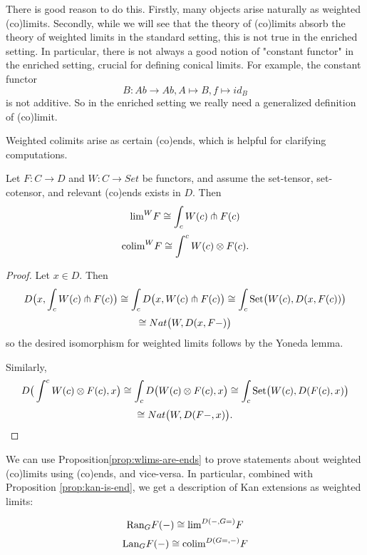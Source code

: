 There is good reason to do this. Firstly, many objects arise naturally as weighted (co)limits. Secondly, while we will see that the theory of (co)limits absorb the theory of weighted limits in the standard setting, this is not true in the enriched setting. In particular, there is not always a good notion of "constant functor" in the enriched setting, crucial for defining conical limits. For example, the constant functor $$B:Ab\rightarrow Ab, A\mapsto B, f\mapsto id_B$$ is not additive. So in the enriched setting we really need a generalized definition of (co)limit.

Weighted colimits arise as certain (co)ends, which is helpful for clarifying computations.
\begin{proposition}\label{prop:wlims-are-ends}
Let $F:C\rightarrow D$ and $W:C\rightarrow Set$ be functors, and assume the set-tensor, set-cotensor, and relevant (co)ends exists in $D$. Then
$$\text{lim}^{W}F\cong \int_c W(c)\pitchfork F(c)$$
$$\text{colim}^{W}F\cong \int^c W(c)\otimes F(c).$$
\end{proposition}
\begin{proof}
    Let $x\in D$. Then $$D\big(x,\int_c W(c)\pitchfork F(c)\big)\cong \int_cD\big(x,W(c)\pitchfork F(c)\big)\cong \int_c {\text{Set}}\big(W(c),D(x,F(c))\big)$$
    $$\cong Nat\big(W,D(x,F-)\big)$$
    so the desired isomorphism for weighted limits follows by the Yoneda lemma. 
    
    Similarly, $$D\big(\int^c W(c)\otimes F(c),x\big)\cong \int_cD\big(W(c)\otimes F(c),x\big)\cong \int_c {\text{Set}}\big(W(c),D(F(c),x)\big)$$
    $$\cong Nat\big(W,D(F-,x)\big).$$
\end{proof}

We can use Proposition\autoref{prop:wlims-are-ends} to prove statements about weighted (co)limits using (co)ends, and vice-versa. In particular, combined with Proposition \ref{prop:kan-is-end}, we get a description of Kan extensions as weighted limits:

    $$\text{Ran}_GF(-)\cong\text{lim}^{D(-,G=)}F$$
    $$\text{Lan}_GF(-)\cong\text{colim}^{D(G=,-)}F$$


